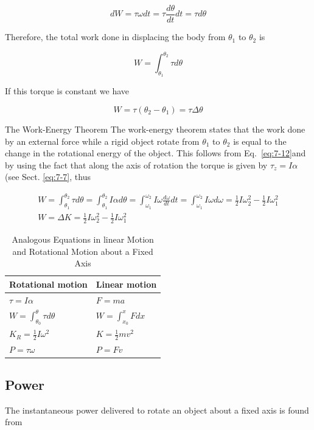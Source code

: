 \documentclass[10pt]{article}
\numberwithin{equation}{section}
\begin{document}
$$
d W=\tau \omega d t=\tau \frac{d \theta}{d t} d t=\tau d \theta
$$

Therefore, the total work done in displacing the body from $\theta_{1}$ to $\theta_{2}$ is


\begin{equation}
W=\int_{\theta_{1}}^{\theta_{2}} \tau d \theta \label{eq:7-12}
\end{equation}


If this torque is constant we have

$$
W=\tau\left(\theta_{2}-\theta_{1}\right)=\tau \Delta \theta
$$

The Work-Energy Theorem The work-energy theorem states that the work done by an external force while a rigid object rotate from $\theta_{1}$ to $\theta_{2}$ is equal to the change in the rotational energy of the object. This follows from Eq.~\eqref{eq:7-12}and by using the fact that along the axis of rotation the torque is given by $\tau_{z}=I \alpha$ (see Sect. \eqref{eq:7-7}, thus

$$
\begin{gathered}
W=\int_{\theta_{1}}^{\theta_{2}} \tau d \theta=\int_{\theta_{1}}^{\theta_{2}} I \alpha d \theta=\int_{\omega_{1}}^{\omega_{2}} I \omega \frac{d \omega}{d t} d t=\int_{\omega_{1}}^{\omega_{2}} I \omega d \omega=\frac{1}{2} I \omega_{2}^{2}-\frac{1}{2} I \omega_{1}^{2} \\
W=\Delta K=\frac{1}{2} I \omega_{2}^{2}-\frac{1}{2} I \omega_{1}^{2}
\end{gathered}
$$

\begin{table}[htbp]
\centering
\begin{tabular}{l|l}
\hline
Rotational motion & Linear motion \\
\hline
$\tau=I \alpha$ & $F=m a$ \\
\hline
$W=\int_{\theta_{0}}^{\theta} \tau d \theta$ & $W=\int_{x_{0}}^{x} F d x$ \\
\hline
$K_{R}=\frac{1}{2} I \omega^{2}$ & $K=\frac{1}{2} m v^{2}$ \\
\hline
$P=\tau \omega$ & $P=F v$ \\
\hline
\end{tabular}
\caption{Analogous Equations in linear Motion and Rotational Motion about a Fixed Axis}\label{tab:7-2}
\end{table}

\subsection{Power}\label{sec:7-10}
The instantaneous power delivered to rotate an object about a fixed axis is found from
\end{document}
